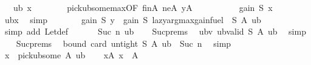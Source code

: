 \begin{isabellebody}
\ {\isachardoublequoteopen}{\isasymdots}\ {\isasymle}\ ub\ {\isacharquery}{\kern0pt}x{\isachardoublequoteclose}\isanewline
\ \ \ \ \ \ \isamarkupfalse%
\ pick{\isacharunderscore}{\kern0pt}ub{\isacharunderscore}{\kern0pt}some{\isacharunderscore}{\kern0pt}max{\isacharbrackleft}{\kern0pt}OF\ finA\ neA\ yA{\isacharbrackright}{\kern0pt}\ \isakeywordONE{{\isachardot}{\kern0pt}}\isamarkupfalse%
\isanewline
\ \ \ \ \isamarkupfalse%
\ \isamarkupfalse%
\ {\isachardoublequoteopen}{\isasymdots}\ {\isacharequal}{\kern0pt}\ gain\ S\ {\isacharquery}{\kern0pt}x{\isachardoublequoteclose}\isanewline
\ \ \ \ \ \ \isamarkupfalse%
\ ubx\ \isamarkupfalse%
\ simp\isanewline
\ \ \ \ \isamarkupfalse%
\ \isamarkupfalse%
\ {\isachardoublequoteopen}gain\ S\ y\ {\isasymle}\ gain\ S\ {\isacharparenleft}{\kern0pt}lazy{\isacharunderscore}{\kern0pt}argmax{\isacharunderscore}{\kern0pt}gain{\isacharunderscore}{\kern0pt}fuel\ {}\ S\ A\ ub{\isacharparenright}{\kern0pt}{\isachardoublequoteclose}\ \isanewline
\ \ \ \ \ \ \isamarkupfalse%
\ {\isacharparenleft}{\kern0pt}simp\ add{\isacharcolon}{\kern0pt}\ Let{\isacharunderscore}{\kern0pt}def{\isacharparenright}{\kern0pt}\isanewline
\ \ \isamarkupfalse%
\isanewline
{}\isamarkupfalse%
\isanewline
\ \ \isamarkupfalse%
\ {\isacharparenleft}{\kern0pt}Suc\ n\ ub{\isacharparenright}{\kern0pt}\isanewline
\ \ \isamarkupfalse%
\ Suc{\isachardot}{\kern0pt}prems\ \isamarkupfalse%
\ ubv{\isacharcolon}{\kern0pt}\ {\isachardoublequoteopen}ub{\isacharunderscore}{\kern0pt}valid\ S\ A\ ub{\isachardoublequoteclose}\ \isamarkupfalse%
\ simp\isanewline
\ \ \isamarkupfalse%
\ Suc{\isachardot}{\kern0pt}prems\ \isamarkupfalse%
\ bound{\isacharcolon}{\kern0pt}\ {\isachardoublequoteopen}card\ {\isacharparenleft}{\kern0pt}untight\ S\ A\ ub{\isacharparenright}{\kern0pt}\ {\isasymle}\ Suc\ n{\isachardoublequoteclose}\ \isamarkupfalse%
\ simp\isanewline
\isanewline
\ \ \isamarkupfalse%
\ {\isacharquery}{\kern0pt}x\ {\isacharequal}{\kern0pt}\ {\isachardoublequoteopen}pick{\isacharunderscore}{\kern0pt}ub{\isacharunderscore}{\kern0pt}some\ A\ ub{\isachardoublequoteclose}\isanewline
\ \ \isamarkupfalse%
\ xA{\isacharcolon}{\kern0pt}\ {\isachardoublequoteopen}{\isacharquery}{\kern0pt}x\ {\isasymin}\ A{\isachardoublequoteclose}\ \isamarkupfalse%

\end{isabellebody}
